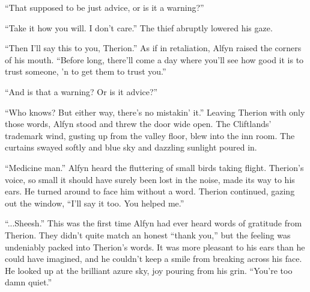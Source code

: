 ``That supposed to be just advice, or is it a warning?''

``Take it how you will. I don't care.'' The thief abruptly lowered his gaze.

``Then I'll say this to you, Therion.'' As if in retaliation, Alfyn raised the corners of his mouth. ``Before long, there'll come a day where you'll see how good it is to trust someone, 'n to get them to trust you.''

``And is that a warning? Or is it advice?''

``Who knows? But either way, there's no mistakin' it.'' Leaving Therion with only those words, Alfyn stood and threw the door wide open. The Cliftlands' trademark wind, gusting up from the valley floor, blew into the inn room. The curtains swayed softly and blue sky and dazzling sunlight poured in. 

``Medicine man.'' Alfyn heard the fluttering of small birds taking flight. Therion's voice, so small it should have surely been lost in the noise, made its way to his ears. He turned around to face him without a word. Therion continued, gazing out the window, ``I'll say it too. You helped me.''

``...Sheesh.'' This was the first time Alfyn had ever heard words of gratitude from Therion. They didn't quite match an honest ``thank you,'' but the feeling was undeniably packed into Therion's words. It was more pleasant to his ears than he could have imagined, and he couldn't keep a smile from breaking across his face. He looked up at the brilliant azure sky, joy pouring from his grin. ``You're too damn quiet.''
\printendnotes